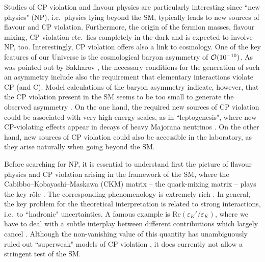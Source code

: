 \documentclass[11pt]{cernrep}
\begin{document}
Studies of CP violation and flavour physics are particularly interesting since
``new physics" (NP), i.e.\ physics lying beyond the SM, typically leads to
new sources of flavour and CP violation. Furthermore, the origin of the
fermion masses, flavour mixing, CP violation etc.\ lies completely in the
dark and is expected to involve NP, too. Interestingly, CP violation
offers also a link to cosmology. One of the key features of our Universe is the
cosmological baryon asymmetry of ${\cal O}(10^{-10})$. As was pointed
out by Sakharov \cite{sach}, the necessary conditions for the generation of 
such an asymmetry include also the requirement that elementary interactions
violate CP (and C). Model calculations of the baryon asymmetry indicate, however,
that the CP violation present in the SM seems to be too small to generate
the observed asymmetry  \cite{shapos}. On the one hand, the required new sources 
of CP violation could be associated with very high energy scales, as in 
``leptogenesis", where new CP-violating effects appear in decays of heavy
Majorana neutrinos \cite{LG-rev}. On the other hand, new sources of
CP violation could also be accessible in the laboratory, as they arise 
naturally when going beyond the SM. 

Before searching for NP, it is essential to understand first the picture of
flavour physics and CP violation arising in the framework of the SM,
where the Cabibbo--Kobayashi--Maskawa (CKM) matrix -- the
quark-mixing matrix -- plays the key r\^ole \cite{cab,KM}. The 
corresponding phenomenology is extremely rich \cite{CKM-book}. In general,
the key problem for the theoretical interpretation is related to strong
interactions, i.e.\ to ``hadronic" uncertainties. A famous example is
$\mbox{Re}(\varepsilon_K'/\varepsilon_K)$, where we
have to deal with a subtle interplay between different contributions
which largely cancel \cite{epsp-rev}. Although the non-vanishing value of this
quantity has unambiguously ruled out ``superweak" models of
CP violation \cite{superweak}, it does currently not allow a stringent
test of the SM. 
\end{document}
